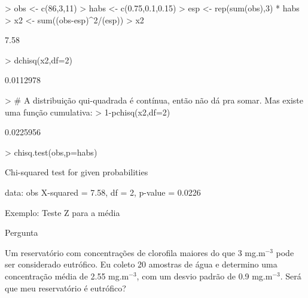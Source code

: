 \documentclass{beamer}
\begin{document}
\begin{frame}[fragile]

\begin{Schunk}
\begin{Sinput}
> obs <- c(86,3,11)
> habs <- c(0.75,0.1,0.15)
> esp <- rep(sum(obs),3) * habs
> x2 <- sum((obs-esp)^2/(esp))
> x2
\end{Sinput}
\begin{Soutput}
[1] 7.58
\end{Soutput}
\begin{Sinput}
> dchisq(x2,df=2)
\end{Sinput}
\begin{Soutput}
[1] 0.0112978
\end{Soutput}
\begin{Sinput}
> # A distribuição qui-quadrada é contínua, então não dá pra somar. Mas existe uma função cumulativa:
> 1-pchisq(x2,df=2)
\end{Sinput}
\begin{Soutput}
[1] 0.0225956
\end{Soutput}
\begin{Sinput}
> chisq.test(obs,p=habs)
\end{Sinput}
\begin{Soutput}
	Chi-squared test for given probabilities

data:  obs
X-squared = 7.58, df = 2, p-value = 0.0226
\end{Soutput}
\end{Schunk}

\end{frame} 


\begin{frame}{Exemplo: Teste Z para a média}

\begin{block}{Pergunta}

Um reservatório com concentrações de clorofila maiores do que 3 mg.m$^{-3}$ pode ser considerado eutrófico. Eu coleto 20 amostras de água e determino uma concentração média de 2.55 mg.m$^{-3}$, com um desvio padrão de 0.9 mg.m$^{-3}$. Será que meu reservatório é eutrófico? 

\end{block}

\end{frame} 
\end{document}
